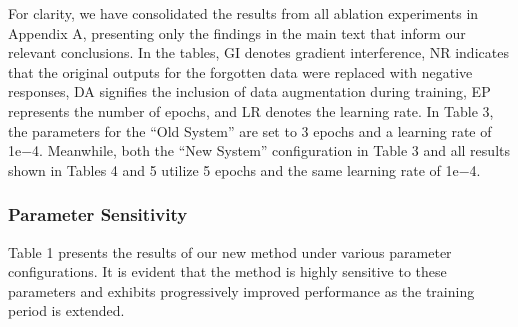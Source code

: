 \documentclass[11pt]{article}
\begin{document}
For clarity, we have consolidated the results from all ablation experiments in Appendix A, presenting only the findings in the main text that inform our relevant conclusions. In the tables, GI denotes gradient interference, NR indicates that the original outputs for the forgotten data were replaced with negative responses, DA signifies the inclusion of data augmentation during training, EP represents the number of epochs, and LR denotes the learning rate. 
In Table 3, the parameters for the “Old System” are set to 3 epochs and a learning rate of 
1e−4. Meanwhile, both the “New System” configuration in Table 3 and all results shown in Tables 4 and 5 utilize 5 epochs and the same learning rate of 1e−4.




\subsubsection{Parameter Sensitivity}  

Table 1 presents the results of our new method under various parameter configurations. It is evident that the method is highly sensitive to these parameters and exhibits progressively improved performance as the training period is extended.

\end{document}
